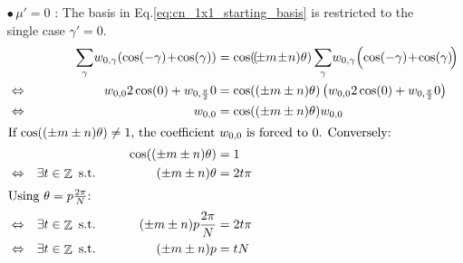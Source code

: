 \documentclass{article}
\newcommand{\lp}{\left(}
\newcommand{\rp}{\right)}
\DeclareMathOperator*{\Z}{\mathbb{Z}}
\begin{document}
\begin{itemize}
	\item[$\bullet\,\mu' = 0$]:
		The basis in Eq.\eqref{eq:cn_1x1_starting_basis} is restricted to the single case $\gamma' = 0$.
		\begin{align*}
			&				 & \span\span \sum_{\gamma} \!w_{0, \gamma} \!\lp\cos(-\gamma)  \!+\! \cos(\gamma)\rp
			& = \cos(\!(\!\pm m\! \pm\! n) \theta) \sum_{\gamma} \!w_{0, \gamma}  \Big(\! \cos(-\gamma) \!+\! \cos(\gamma) \!\Big) \\
			&\Leftrightarrow & \span\span w_{0, 0} 2 \cos(0) + w_{0, {\pi\over2}} 0 
			& = \cos((\pm m \pm n) \theta) \lp w_{0, 0} 2 \cos(0) + w_{0, {\pi\over2}} 0 \rp \\
			&\Leftrightarrow & \span\span w_{0, 0} &= \cos((\pm m \pm n) \theta) w_{0, 0} \\
			\intertext{If $\cos((\pm m \pm n)\theta) \neq 1$, the coefficient $w_{0,0}$ is forced to $0$.
				Conversely:
			}
			&                & \span\span 										\cos((\pm m \pm n)\theta) &= 1 \\
		    &\Leftrightarrow & \exists t \in \Z \text{ s.t. } \quad\quad &&			 (\pm m \pm n )\theta &= 2t\pi \\
\intertext{Using $\theta = p {2\pi \over N}$:}
		    &\Leftrightarrow & \exists t \in \Z \text{ s.t. } \quad\quad && (\pm m \pm n )p {2\pi\over N} &= 2t\pi \\
		    &\Leftrightarrow & \exists t \in \Z \text{ s.t. } \quad\quad &&				   (\pm m \pm n)p &= tN
		\end{align*}



\end{itemize}
\end{document}
